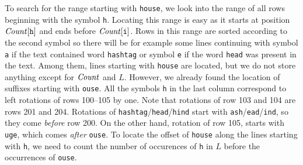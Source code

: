 To search for the range starting with {\tt house}, we look into the range of all rows beginning with the
symbol {\tt h}. Locating this range is easy as it starts at position $\mathit{Count}[\texttt{h}]$ and ends before
$\mathit{Count}[\texttt{i}]$. Rows in this range are sorted according to the second symbol so there will be for
example some lines continuing with symbol {\tt a} if the text contained word {\tt hashtag} or symbol {\tt e}
if the word {\tt head} was present in the text. Among them, lines starting with {\tt house} are located,
but we do not store anything except for $\mathit{Count}$ and $L$. However, we already found the location of
suffixes starting with {\tt ouse}. All the symbols {\tt h} in the last column correspond to left rotations
of rows 100--105 by one. Note that rotations of row 103 and 104 are rows 201 and 204. Rotations of
\texttt{hashtag}/\texttt{head}/\texttt{hind} start with \texttt{ash}/\texttt{ead}/\texttt{ind}, so they
come \emph{before} row 200. On the other hand, rotation of row 105, starts with {\tt uge}, which comes
\emph{after} {\tt ouse}. To locate the offset of {\tt house} along the lines starting with {\tt h},
we need to count the number of occurences of {\tt h} in $L$ before the occurrences of {\tt ouse}.  

